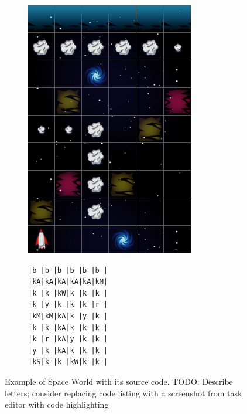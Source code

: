 \begin{figure}[h]
\begin{center}
\begin{subfigure}{.4\textwidth}
\centering
\includegraphics[width=.9\textwidth]{img/spaceworld}
\end{subfigure}
\begin{subfigure}{.36\textwidth}
\centering
{\lstset{numbers=none}
\begin{lstlisting}
|b |b |b |b |b |b |
|kA|kA|kA|kA|kA|kM|
|k |k |kW|k |k |k |
|k |y |k |k |k |r |
|kM|kM|kA|k |y |k |
|k |k |kA|k |k |k |
|k |r |kA|y |k |k |
|y |k |kA|k |k |k |
|kS|k |k |kW|k |k |
\end{lstlisting}}
\end{subfigure}
\end{center}
\caption{Example of Space World with its source code. TODO: Describe letters; consider replacing code listing with a screenshot from task editor with code highlighting}
\label{fig:spaceworld-source}
\end{figure}


